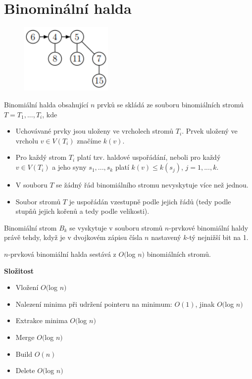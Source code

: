\documentclass{szzclass}
\begin{document}
\newpage

\section{Binominální halda}

\begin{figure}[h]
\centering
\includegraphics[width=0.4\textwidth]{topics/bi-spol-05/images/binominal-heap.png}
\end{figure}

Binomiální halda obsahující $n$ prvků se skládá ze souboru
binomiálních stromů $T = T_1, . . . , T_i$, kde
\begin{itemize}
    \item Uchovávané prvky jsou uloženy ve vrcholech stromů $T_i$.
    Prvek uložený ve vrcholu $v \in V(T_i)$ značíme $k(v)$.
    \item  Pro každý strom $T_i$ platí tzv. haldové uspořádání, neboli pro
    každý $v \in V(T_i)$ a jeho syny $s_1, . . . , s_k$ platí $k(v) \leq k(s_j)$,
    $j = 1, . . . , k$.
    \item V souboru $T$ se žádný řád binomiálního stromu nevyskytuje
    více než jednou.
    \item Soubor stromů $T$ je uspořádán vzestupně podle jejich řádů
    (tedy podle stupňů jejich kořenů a tedy podle velikosti).
\end{itemize}

Binomiální strom $B_k$ se vyskytuje v souboru stromů $n$-prvkové
binomiální haldy právě tehdy, když je v dvojkovém zápisu čísla $n$
nastavený $k$-tý nejnižší bit na 1.

$n$-prvková binomiální halda sestává z $O($log $n)$ binomiálních stromů.


\textbf{Složitost}
\begin{itemize}
    \item Vložení $O($log $n)$
    \item Nalezení minima při udržení pointeru na minimum: $O(1)$, jinak $O($log $n)$
    \item Extrakce minima $O($log $n)$
    \item Merge $O($log $n)$
    \item Build $O(n)$
    \item Delete $O($log $n)$
\end{itemize}
\end{document}
